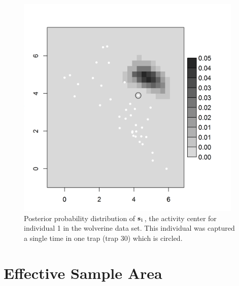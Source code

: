 {\begin{figure}[ht]
\begin{center}
\includegraphics[height=4.25in,width=4.25in]{Ch4-SCR0/figs/wolv_post_s}
\end{center}
\caption{
Posterior probability distribution of ${\bf s}_{1}$, the activity
center for individual 1 in the wolverine data set. This individual was
captured a single time in one trap (trap 30) which is circled.
}
\label{scr0.fig.guy1}
\end{figure}


\section{Effective Sample Area}
\label{scr0.sec.esa}

}
